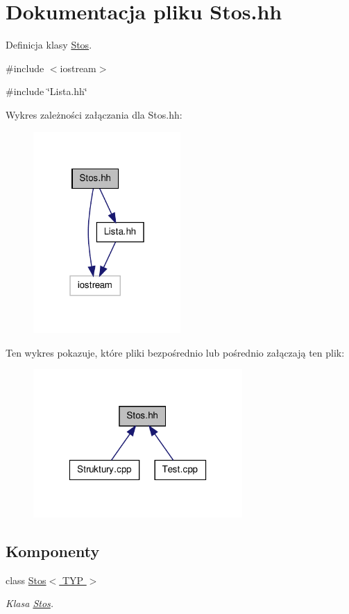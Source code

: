 \hypertarget{_stos_8hh}{
\section{Dokumentacja pliku Stos.hh}
\label{_stos_8hh}
}


Definicja klasy \hyperlink{class_stos}{Stos}.  


{\ttfamily \#include $<$iostream$>$}\par
{\ttfamily \#include \char`\"{}Lista.hh\char`\"{}}\par
Wykres zależności załączania dla Stos.hh:
\nopagebreak
\begin{figure}[H]
\begin{center}
\leavevmode
\includegraphics[width=159pt]{_stos_8hh__incl}
\end{center}
\end{figure}
Ten wykres pokazuje, które pliki bezpośrednio lub pośrednio załączają ten plik:
\nopagebreak
\begin{figure}[H]
\begin{center}
\leavevmode
\includegraphics[width=226pt]{_stos_8hh__dep__incl}
\end{center}
\end{figure}
\subsection*{Komponenty}
\begin{DoxyCompactItemize}
\item 
class \hyperlink{class_stos}{Stos$<$ TYP $>$}
\begin{DoxyCompactList}\small\item\em Klasa \hyperlink{class_stos}{Stos}. \item\end{DoxyCompactList}\end{DoxyCompactItemize}


